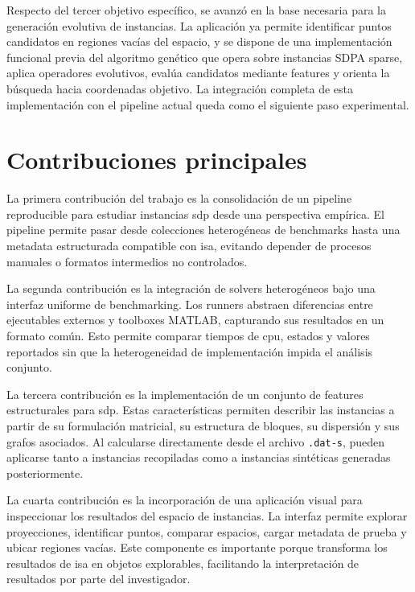 Respecto del tercer objetivo específico, se avanzó en la base necesaria para la
generación evolutiva de instancias.
La aplicación ya permite identificar puntos candidatos en regiones vacías del espacio,
y se dispone de una implementación funcional previa del algoritmo genético que opera
sobre instancias SDPA sparse, aplica operadores evolutivos, evalúa candidatos mediante
features y orienta la búsqueda hacia coordenadas objetivo.
La integración completa de esta implementación con el pipeline actual queda como el
siguiente paso experimental.

\section{Contribuciones principales}
\label{sec:conclusiones_contribuciones}

La primera contribución del trabajo es la consolidación de un pipeline reproducible
para estudiar instancias \acrshort{sdp} desde una perspectiva empírica.
El pipeline permite pasar desde colecciones heterogéneas de benchmarks hasta una
metadata estructurada compatible con \acrshort{isa}, evitando depender de procesos
manuales o formatos intermedios no controlados.

La segunda contribución es la integración de solvers heterogéneos bajo una interfaz
uniforme de benchmarking.
Los runners abstraen diferencias entre ejecutables externos y toolboxes MATLAB,
capturando sus resultados en un formato común.
Esto permite comparar tiempos de \acrshort{cpu}, estados y valores reportados sin que
la heterogeneidad de implementación impida el análisis conjunto.

La tercera contribución es la implementación de un conjunto de features estructurales
para \acrshort{sdp}.
Estas características permiten describir las instancias a partir de su formulación
matricial, su estructura de bloques, su dispersión y sus grafos asociados.
Al calcularse directamente desde el archivo \texttt{.dat-s}, pueden aplicarse tanto a
instancias recopiladas como a instancias sintéticas generadas posteriormente.

La cuarta contribución es la incorporación de una aplicación visual para inspeccionar
los resultados del espacio de instancias.
La interfaz permite explorar proyecciones, identificar puntos, comparar espacios,
cargar metadata de prueba y ubicar regiones vacías.
Este componente es importante porque transforma los resultados de \acrshort{isa} en
objetos explorables, facilitando la interpretación de resultados por parte del
investigador.

